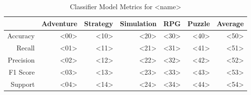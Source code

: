 \begin{table}[h]
    \centering
    \begin{tabular}{r|r|r|r|r|r|r}
        & Adventure & Strategy & Simulation & RPG & Puzzle & Average \\\hline
        Accuracy    & <00> & <10> & <20> & <30> & <40> & <50>\\
        Recall      & <01> & <11> & <21> & <31> & <41> & <51>\\
        Precision   & <02> & <12> & <22> & <32> & <42> & <52>\\
        F1 Score    & <03> & <13> & <23> & <33> & <43> & <53>\\
        Support     & <04> & <14> & <24> & <34> & <44> & <54>
\end{tabular}
    \caption{Classifier Model Metrics for <name>}
    \label{tab:model_metrics}
\end{table}
